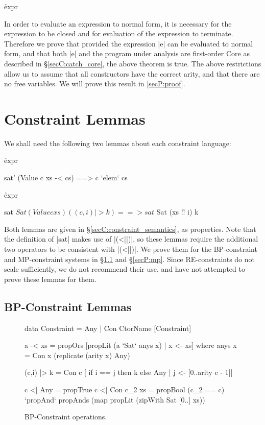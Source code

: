 \h{expr}

In order to evaluate an expression to normal form, it is necessary for the expression to be closed and for evaluation of the expression to terminate. Therefore we prove that provided the expression |e| can be evaluated to normal form, and that both |e| and the program under analysis are first-order Core as described in \S\ref{secC:catch_core}, the above theorem is true. The above restrictions allow us to assume that all constructors have the correct arity, and that there are no free variables. We will prove this result in \ref{secP:proof}.


\section{Constraint Lemmas}
\label{secP:constraint}

We shall need the following two lemmas about each constraint language:


\h{expr}\begin{code}
sat' (Value c xs -< cs) ==> c `elem` cs
\end{code}


\h{expr}\begin{code}
sat $ Sat (Value c xs) ((c,i) |> k) ==> sat $ Sat (xs !! i) k
\end{code}

Both lemmas are given in \S\ref{secC:constraint_semantics}, as properties. Note that the definition of |sat| makes use of |(<||)|, so these lemmas require the additional two operators to be consistent with |(<||)|. We prove them for the BP-constraint and MP-constraint systems in \S\ref{secP:bp} and \S\ref{secP:mp}. Since RE-constraints do not scale sufficiently, we do not recommend their use, and have not attempted to prove these lemmas for them.

\subsection{BP-Constraint Lemmas}
\label{secP:bp}

\begin{figure}
\begin{code}
data Constraint  =  Any
                 |  Con CtorName [Constraint]

a -< xs = propOrs [propLit (a `Sat` anys x) | x <- xs]
    where anys x = Con x (replicate (arity x) Any)

(c,i) |> k = Con c  [  if i == j then k else Any
                    |  j <- [0..arity c - 1]]

c <| Any         =  propTrue
c <| Con c_2 xs  =  propBool (c_2 == c) `propAnd` propAnds (map propLit (zipWith Sat [0..] xs))
\end{code}
\caption{BP-Constraint operations.}
\label{figP:bp}
\end{figure}

